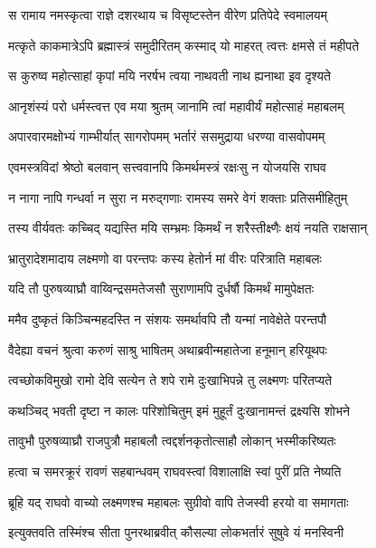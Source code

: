 \twolineshloka
{स रामाय नमस्कृत्वा राज्ञे दशरथाय च}
{विसृष्टस्तेन वीरेण प्रतिपेदे स्वमालयम्} %

\twolineshloka
{मत्कृते काकमात्रेऽपि ब्रह्मास्त्रं समुदीरितम्}
{कस्माद् यो माहरत् त्वत्तः क्षमसे तं महीपते} %

\twolineshloka
{स कुरुष्व महोत्साहां कृपां मयि नरर्षभ}
{त्वया नाथवती नाथ ह्यनाथा इव दृश्यते} %

\twolineshloka
{आनृशंस्यं परो धर्मस्त्वत्त एव मया श्रुतम्}
{जानामि त्वां महावीर्यं महोत्साहं महाबलम्} %

\twolineshloka
{अपारवारमक्षोभ्यं गाम्भीर्यात् सागरोपमम्}
{भर्तारं ससमुद्राया धरण्या वासवोपमम्} %

\twolineshloka
{एवमस्त्रविदां श्रेष्ठो बलवान् सत्त्ववानपि}
{किमर्थमस्त्रं रक्षःसु न योजयसि राघव} %

\twolineshloka
{न नागा नापि गन्धर्वा न सुरा न मरुद्गणाः}
{रामस्य समरे वेगं शक्ताः प्रतिसमीहितुम्} %

\twolineshloka
{तस्य वीर्यवतः कच्चिद् यद्यस्ति मयि सम्भ्रमः}
{किमर्थं न शरैस्तीक्ष्णैः क्षयं नयति राक्षसान्} %

\twolineshloka
{भ्रातुरादेशमादाय लक्ष्मणो वा परन्तपः}
{कस्य हेतोर्न मां वीरः परित्राति महाबलः} %

\twolineshloka
{यदि तौ पुरुषव्याघ्रौ वाय्विन्द्रसमतेजसौ}
{सुराणामपि दुर्धर्षौ किमर्थं मामुपेक्षतः} %

\twolineshloka
{ममैव दुष्कृतं किञ्चिन्महदस्ति न संशयः}
{समर्थावपि तौ यन्मां नावेक्षेते परन्तपौ} %

\twolineshloka
{वैदेह्या वचनं श्रुत्वा करुणं साश्रु भाषितम्}
{अथाब्रवीन्महातेजा हनूमान् हरियूथपः} %

\twolineshloka
{त्वच्छोकविमुखो रामो देवि सत्येन ते शपे}
{रामे दुःखाभिपन्ने तु लक्ष्मणः परितप्यते} %

\twolineshloka
{कथञ्चिद् भवती दृष्टा न कालः परिशोचितुम्}
{इमं मुहूर्तं दुःखानामन्तं द्रक्ष्यसि शोभने} %

\twolineshloka
{तावुभौ पुरुषव्याघ्रौ राजपुत्रौ महाबलौ}
{त्वद्दर्शनकृतोत्साहौ लोकान् भस्मीकरिष्यतः} %

\twolineshloka
{हत्वा च समरक्रूरं रावणं सहबान्धवम्}
{राघवस्त्वां विशालाक्षि स्वां पुरीं प्रति नेष्यति} %

\twolineshloka
{ब्रूहि यद् राघवो वाच्यो लक्ष्मणश्च महाबलः}
{सुग्रीवो वापि तेजस्वी हरयो वा समागताः} %

\twolineshloka
{इत्युक्तवति तस्मिंश्च सीता पुनरथाब्रवीत्}
{कौसल्या लोकभर्तारं सुषुवे यं मनस्विनी} %


